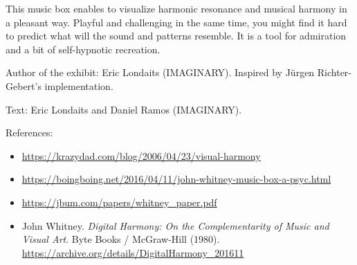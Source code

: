 This music box enables to visualize harmonic resonance and musical harmony in a pleasant way. Playful and challenging in the same time, you might find it hard to predict what will the sound and patterns resemble. It is a tool for admiration and a bit of self-hypnotic recreation.



\begin{sectcredits}
\item[Author of the exhibit:] Eric Londaits (IMAGINARY). Inspired by Jürgen Richter-Gebert's implementation.

\item[Text:] Eric Londaits and Daniel Ramos (IMAGINARY).

\item[References:] \strut
\noindent \begin{itemize}[leftmargin=*]
\item \url{https://krazydad.com/blog/2006/04/23/visual-harmony}

\item \url{https://boingboing.net/2016/04/11/john-whitney-music-box-a-psyc.html}

\item \url{https://jbum.com/papers/whitney_paper.pdf}

\item John Whitney. \emph{Digital Harmony: On the Complementarity of Music and Visual Art}. Byte Books / McGraw-Hill (1980). \\
\url{https://archive.org/details/DigitalHarmony_201611}

\end{itemize}
\end{sectcredits}
